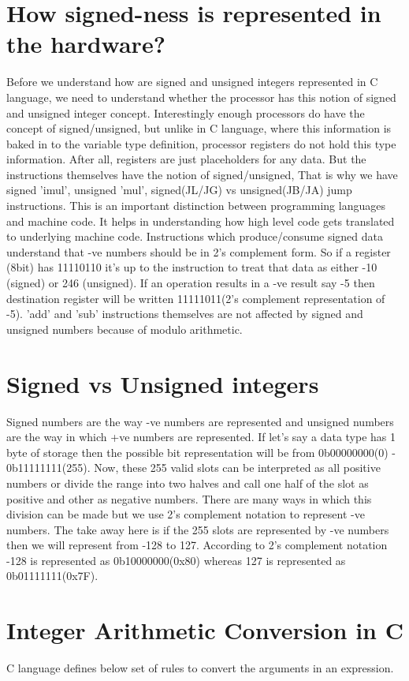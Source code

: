 \documentclass{article}
\begin{document}
\section{How signed-ness is represented in the hardware?}
Before we understand how are signed and unsigned integers represented in C
language, we need to understand whether the processor has this notion of signed
and unsigned integer concept. Interestingly enough processors do have the
concept of signed/unsigned, but unlike in C language, where this information is
baked in to the variable type definition, processor registers do not hold this
type information. After all, registers are just placeholders for any data. But
the instructions themselves have the notion of signed/unsigned, That is why we
have signed 'imul', unsigned 'mul', signed(JL/JG) vs unsigned(JB/JA) jump
instructions. This is an important distinction between programming languages and
machine code. It helps in understanding how high level code gets translated to
underlying machine code. Instructions which produce/consume signed data
understand that -ve numbers should be in 2's complement form. So if a register
(8bit) has 11110110 it's up to the instruction to treat that data as either -10 
(signed) or 246 (unsigned). If an operation results in a -ve result say -5 then
destination register will be written 11111011(2's complement representation of -5).
'add' and 'sub' instructions themselves are not affected by signed and unsigned
numbers because of modulo arithmetic.

\section{Signed vs Unsigned integers}
Signed numbers are the way -ve numbers are represented and unsigned numbers are
the way in which +ve numbers are represented. If let's say a data type has 1
byte of storage then the possible bit representation will be from  0b00000000(0)
- 0b11111111(255). Now, these 255 valid slots can be interpreted as all positive
numbers or divide the range into two halves and call one half of the slot as
positive and other as negative numbers. There are many ways in which this
division can be made but we use 2's complement notation to represent -ve
numbers. The take away here is if the 255 slots are represented by -ve numbers
then we will represent from -128 to 127. According to 2's complement notation
-128 is represented as 0b10000000(0x80) whereas 127 is represented as
0b01111111(0x7F).

\section{Integer Arithmetic Conversion in C}
C language defines below set of rules to convert the arguments in an expression.
\end{document}
